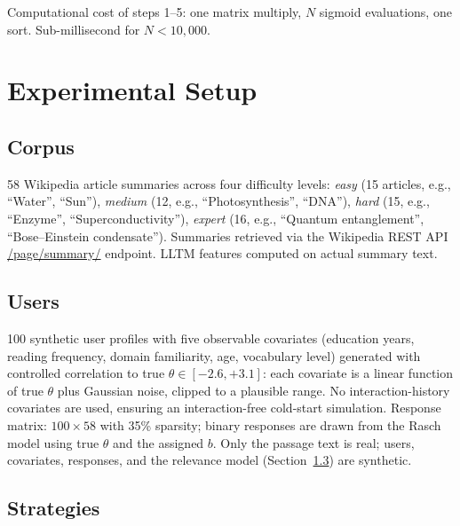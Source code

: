 \documentclass{article}
\begin{document}
Computational cost of steps 1--5: one matrix multiply, $N$ sigmoid evaluations, one sort. Sub-millisecond for $N < 10{,}000$.

\section{Experimental Setup}

\subsection{Corpus}

58 Wikipedia article summaries across four difficulty levels: \textit{easy} (15 articles, e.g., ``Water'', ``Sun''), \textit{medium} (12, e.g., ``Photosynthesis'', ``DNA''), \textit{hard} (15, e.g., ``Enzyme'', ``Superconductivity''), \textit{expert} (16, e.g., ``Quantum entanglement'', ``Bose--Einstein condensate''). Summaries retrieved via the Wikipedia REST API
\url{/page/summary/} endpoint. LLTM features computed on actual summary text.

\subsection{Users}

100 synthetic user profiles with five observable covariates (education years, reading frequency, domain familiarity, age, vocabulary level) generated with controlled correlation to true $\theta \in [-2.6, +3.1]$: each covariate is a linear function of true $\theta$ plus Gaussian noise, clipped to a plausible range. No interaction-history covariates are used, ensuring an interaction-free cold-start simulation. Response matrix: $100 \times 58$ with 35\% sparsity; binary responses are drawn from the Rasch model using true $\theta$ and the assigned $b$. Only the passage text is real; users, covariates, responses, and the relevance model (Section~\ref{sec:strategies}) are synthetic.

\subsection{Strategies}
\label{sec:strategies}
\end{document}
